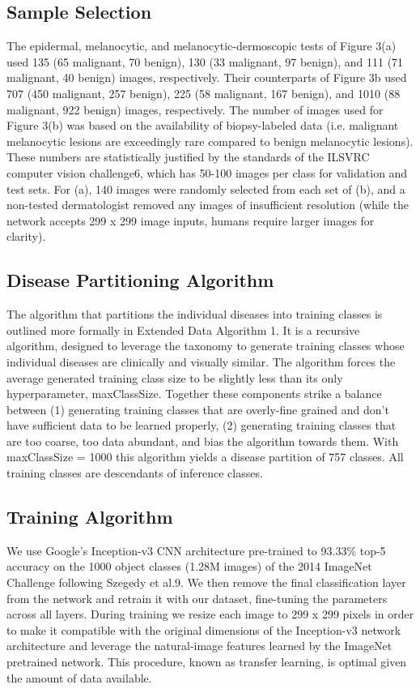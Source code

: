 \subsection{Sample Selection}
The epidermal, melanocytic, and melanocytic-dermoscopic tests of Figure 3(a) used 135 (65 malignant, 70 benign), 130 (33 malignant, 97 benign), and 111 (71 malignant, 40 benign) images, respectively. Their counterparts of Figure 3b used 707 (450 malignant, 257 benign), 225 (58 malignant, 167 benign), and 1010 (88 malignant, 922 benign) images, respectively. The number of images used for Figure 3(b) was based on the availability of biopsy-labeled data (i.e. malignant melanocytic lesions are exceedingly rare compared to benign melanocytic lesions). These numbers are statistically justified by the standards of the ILSVRC computer vision challenge6, which has 50-100 images per class for validation and test sets. For (a), 140 images were randomly selected from each set of (b), and a non-tested dermatologist removed any images of insufficient resolution (while the network accepts 299 x 299 image inputs, humans require larger images for clarity). 

\subsection{Disease Partitioning Algorithm}
The algorithm that partitions the individual diseases into training classes is outlined more formally in Extended Data Algorithm 1. It is a recursive algorithm, designed to leverage the taxonomy to generate training classes whose individual diseases are clinically and visually similar. The algorithm forces the average generated training class size to be slightly less than its only hyperparameter, maxClassSize. Together these components strike a balance between (1) generating training classes that are overly-fine grained and don’t have sufficient data to be learned properly, (2) generating training classes that are too coarse, too data abundant, and bias the algorithm towards them. With maxClassSize = 1000 this algorithm yields a disease partition of 757 classes. All training classes are descendants of inference classes.

\subsection{Training Algorithm}
We use Google’s Inception-v3 CNN architecture pre-trained to 93.33\% top-5 accuracy on the 1000 object classes (1.28M images) of the 2014 ImageNet Challenge following Szegedy et al.9. We then remove the final classification layer from the network and retrain it with our dataset, fine-tuning the parameters across all layers. During training we resize each image to 299 x 299 pixels in order to make it compatible with the original dimensions of the Inception-v3 network architecture and leverage the natural-image features learned by the ImageNet pretrained network. This procedure, known as transfer learning, is optimal given the amount of data available.


